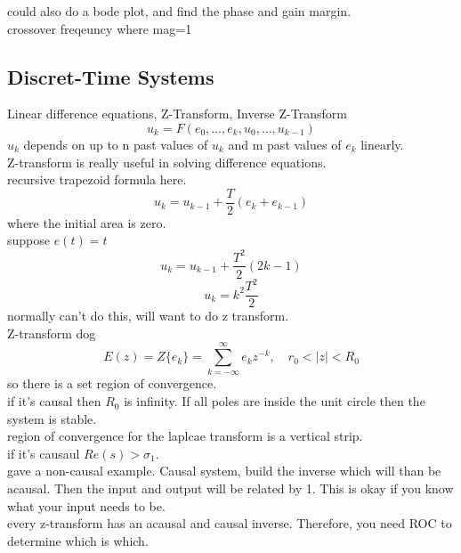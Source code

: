 \documentclass{article}
\begin{document}
could also do a bode plot, and find the phase and gain margin.\\
crossover freqeuncy where mag=1\\

\subsection{Discret-Time Systems}
Linear difference equations, Z-Transform, Inverse Z-Transform
\[u_k=F(e_0,\dots,e_k,u_0,\dots,u_{k-1})\]
$u_k$ depends on up to n past values of $u_k$ and m past values of $e_k$ linearly.\\
Z-transform is really useful in solving difference equations.\\
recursive trapezoid formula here.
\[u_k=u_{k-1}+\frac{T}{2}(e_k+e_{k-1})\]
where the initial area is zero.\\
suppose $e(t)=t$
\[u_k=u_{k-1}+\frac{T^2}{2}(2k-1)\]
\[u_k=k^2\frac{T^2}{2}\]
normally can't do this, will want to do z transform.\\

Z-transform dog\\
\[E(z)=Z\{e_k\}=\sum_{k=-\infty}^{\infty}e_kz^{-k},\quad r_0<\lvert z\rvert<R_0\]
so there is a set region of convergence.\\
if it's causal then $R_0$ is infinity. If all poles are inside the unit circle then the system is stable.\\

region of convergence for the laplcae transform is a vertical strip.\\
if it's causaul $Re(s)>\sigma_1$.\\

gave a non-causal example. Causal system, build the inverse which will than be acausal. Then the input and output will be related by 1. This is okay if you know what your input needs to be.\\

every z-transform has an acausal and causal inverse. Therefore, you need ROC to determine which is which.\\
\end{document}
